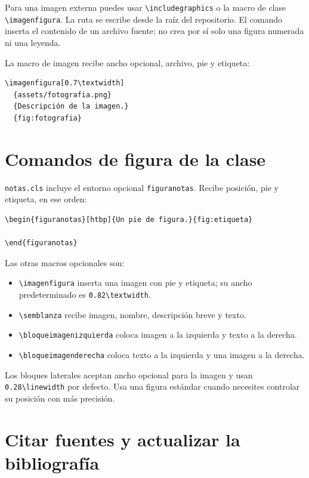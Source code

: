 Para una imagen externa puedes usar \verb|\includegraphics| o la macro de clase \verb|\imagenfigura|. La ruta se escribe desde la raíz del repositorio. El comando \verb|| inserta el contenido de un archivo fuente; no crea por sí solo una figura numerada ni una leyenda.

La macro de imagen recibe ancho opcional, archivo, pie y etiqueta:

\begin{verbatim}
\imagenfigura[0.7\textwidth]
  {assets/fotografia.png}
  {Descripción de la imagen.}
  {fig:fotografia}
\end{verbatim}

\section{Comandos de figura de la clase}

\texttt{notas.cls} incluye el entorno opcional \verb|figuranotas|. Recibe posición, pie y etiqueta, en ese orden:

\begin{verbatim}
\begin{figuranotas}[htbp]{Un pie de figura.}{fig:etiqueta}
  
\end{figuranotas}
\end{verbatim}

Las otras macros opcionales son:

\begin{itemize}
  \item \verb|\imagenfigura| inserta una imagen con pie y etiqueta; su ancho predeterminado es \verb|0.82\textwidth|.
  \item \verb|\semblanza| recibe imagen, nombre, descripción breve y texto.
  \item \verb|\bloqueimagenizquierda| coloca imagen a la izquierda y texto a la derecha.
  \item \verb|\bloqueimagenderecha| coloca texto a la izquierda y una imagen a la derecha.
\end{itemize}

Los bloques laterales aceptan ancho opcional para la imagen y usan \verb|0.28\linewidth| por defecto. Usa una figura estándar cuando necesites controlar su posición con más precisión.

\section{Citar fuentes y actualizar la bibliografía}

